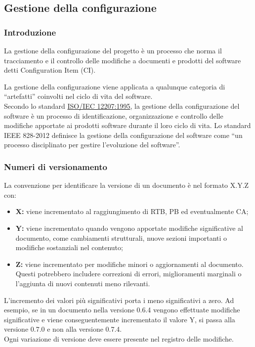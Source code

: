 \subsection{Gestione della configurazione}
\subsubsection{Introduzione}
La gestione della configurazione del progetto è un processo che norma il tracciamento e il controllo delle modifiche a documenti e prodotti del software detti Configuration Item (CI).

La gestione della configurazione viene applicata a qualunque categoria di “artefatti” coinvolti nel ciclo di vita del software. \\
Secondo lo standard \href{https://www.math.unipd.it/~tullio/IS-1/2009/Approfondimenti/ISO_12207-1995.pdf}{ISO/IEC 12207:1995}, la gestione della configurazione del software è un processo di identificazione, organizzazione e controllo delle modifiche apportate ai prodotti software durante il loro ciclo di vita.
Lo standard IEEE 828-2012 definisce la gestione della configurazione del software come “un processo disciplinato per gestire l’evoluzione del software”.

\subsubsection{Numeri di versionamento}\label{sec:versionamento}
La convenzione per identificare la versione di un documento è nel formato X.Y.Z con:
\begin{itemize}
    \item \textbf{X:} viene incrementato al raggiungimento di RTB, PB ed eventualmente CA;
    \item \textbf{Y:} viene incrementato quando vengono apportate modifiche significative al documento, come cambiamenti strutturali, nuove sezioni importanti o modifiche sostanziali nel contenuto;
    \item \textbf{Z:} viene incrementato per modifiche minori o aggiornamenti al documento. Questi potrebbero includere correzioni di errori, miglioramenti marginali o l'aggiunta di nuovi contenuti meno rilevanti.
\end{itemize}

L'incremento dei valori più significativi porta i meno significativi a zero. Ad esempio, se in un documento nella versione 0.6.4 vengono effettuate modifiche significative e viene conseguentemente incrementato il valore Y, si passa alla versione 0.7.0 e non alla versione 0.7.4. \\
Ogni variazione di versione deve essere presente nel registro delle modifiche.

